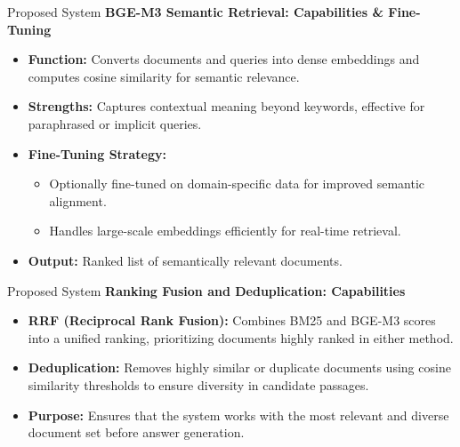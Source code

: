 \begin{frame}{Proposed System}
\textbf{BGE-M3 Semantic Retrieval: Capabilities & Fine-Tuning}

\begin{itemize}
    \item \textbf{Function:} Converts documents and queries into dense embeddings and computes cosine similarity for semantic relevance.
    \item \textbf{Strengths:} Captures contextual meaning beyond keywords, effective for paraphrased or implicit queries.
    \item \textbf{Fine-Tuning Strategy:}
        \begin{itemize}
            \item Optionally fine-tuned on domain-specific data for improved semantic alignment.
            \item Handles large-scale embeddings efficiently for real-time retrieval.
        \end{itemize}
    \item \textbf{Output:} Ranked list of semantically relevant documents.
\end{itemize}
\end{frame}

\begin{frame}{Proposed System}
\textbf{Ranking Fusion and Deduplication: Capabilities}

\begin{itemize}
    \item \textbf{RRF (Reciprocal Rank Fusion):} Combines BM25 and BGE-M3 scores into a unified ranking, prioritizing documents highly ranked in either method.
    \item \textbf{Deduplication:} Removes highly similar or duplicate documents using cosine similarity thresholds to ensure diversity in candidate passages.
    \item \textbf{Purpose:} Ensures that the system works with the most relevant and diverse document set before answer generation.
\end{itemize}
\end{frame}

